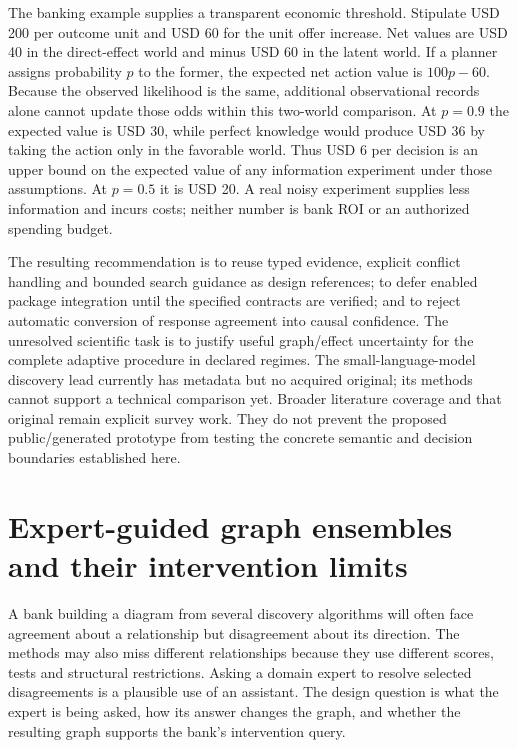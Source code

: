 The banking example supplies a transparent economic threshold. Stipulate
USD 200 per outcome unit and USD 60 for the unit offer increase. Net
values are USD 40 in the direct-effect world and minus USD 60 in the
latent world. If a planner assigns probability \(p\) to the former, the
expected net action value is \(100p-60\). Because the observed
likelihood is the same, additional observational records alone cannot
update those odds within this two-world comparison. At \(p=0.9\) the
expected value is USD 30, while perfect knowledge would produce USD 36
by taking the action only in the favorable world. Thus USD 6 per
decision is an upper bound on the expected value of any information
experiment under those assumptions. At \(p=0.5\) it is USD 20. A real
noisy experiment supplies less information and incurs costs; neither
number is bank ROI or an authorized spending budget.
\citep{exec14_iid_oracle}

The resulting recommendation is to reuse typed evidence, explicit
conflict handling and bounded search guidance as design references; to
defer enabled package integration until the specified contracts are
verified; and to reject automatic conversion of response agreement into
causal confidence. The unresolved scientific task is to justify useful
graph/effect uncertainty for the complete adaptive procedure in declared
regimes. The small-language-model discovery lead currently has metadata
but no acquired original; its methods cannot support a technical
comparison yet. Broader literature coverage and that original remain
explicit survey work. They do not prevent the proposed public/generated
prototype from testing the concrete semantic and decision boundaries
established here.

\label{exec14:iid-discovery-end}


\section{Expert-guided graph ensembles and their intervention limits}
\label{exec20:expert-scope}

A bank building a diagram from several discovery algorithms will often face
agreement about a relationship but disagreement about its direction. The
methods may also miss different relationships because they use different
scores, tests and structural restrictions. Asking a domain expert to resolve
selected disagreements is a plausible use of an assistant. The design question
is what the expert is being asked, how its answer changes the graph, and whether
the resulting graph supports the bank's intervention query.

